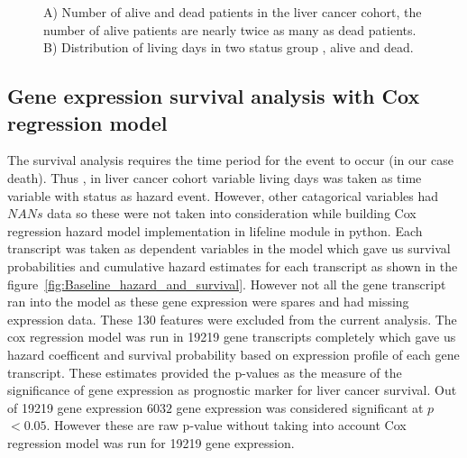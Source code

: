 \documentclass[9pt,twocolumn,twoside]{article}
\begin{document}
\begin{figure}[tbh]
    \centering
    \caption{A) Number of alive and dead patients in the liver cancer cohort, the number of alive patients are nearly twice as many as dead patients. B) Distribution of living days in two status group , alive and dead.\tiny}
    \label{fig:status_livingdays}
\end{figure}

	\subsection {Gene expression survival analysis with Cox regression model}
	
	The survival analysis requires the time period for the event to occur (in our case death). Thus , in liver cancer cohort variable living days was taken as time variable with status as hazard event. However, other catagorical variables had $NANs$ data so these were not taken into consideration while building Cox regression hazard model implementation in lifeline module in python. Each transcript was taken as dependent variables in the model which gave us survival probabilities and cumulative hazard estimates for each transcript as shown in the figure~\ref{fig:Baseline_hazard_and_survival}. However not all the gene transcript ran into the model as these gene expression were spares and had missing expression data. These 130 features were excluded from the current analysis.  The cox regression model was run in 19219 gene transcripts completely which gave us hazard coefficent and survival probability based on expression profile of each gene transcript. These estimates provided the p-values as the measure of the significance of gene expression as prognostic marker for  liver cancer survival. Out of 19219 gene expression $6032$ gene expression was considered significant at $p$ $< 0.05$. However these are raw p-value without taking into account Cox regression model was run for 19219 gene expression. 
	
\end{document}
